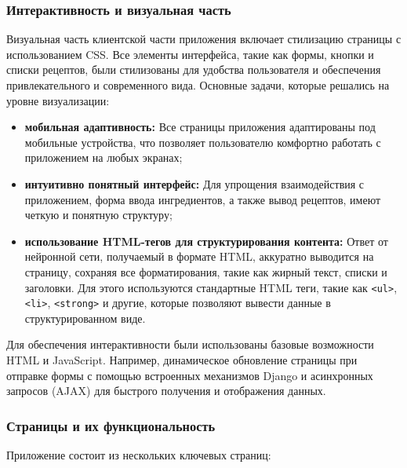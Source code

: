 {{    \subsubsection*{Интерактивность и визуальная часть}
    
    Визуальная часть клиентской части приложения включает стилизацию страницы с использованием CSS. Все элементы интерфейса, такие как формы, кнопки и списки рецептов, были стилизованы для удобства пользователя и обеспечения привлекательного и современного вида. Основные задачи, которые решались на уровне визуализации:
    
    \begin{itemize}
        \item \textbf{мобильная адаптивность:} Все страницы приложения адаптированы под мобильные устройства, что позволяет пользователю комфортно работать с приложением на любых экранах;
        \item \textbf{интуитивно понятный интерфейс:} Для упрощения взаимодействия с приложением, форма ввода ингредиентов, а также вывод рецептов, имеют четкую и понятную структуру;
        \item \textbf{использование HTML-тегов для структурирования контента:} Ответ от нейронной сети, получаемый в формате HTML, аккуратно выводится на страницу, сохраняя все форматирования, такие как жирный текст, списки и заголовки. Для этого используются стандартные HTML теги, такие как \texttt{<ul>}, \texttt{<li>}, \texttt{<strong>} и другие, которые позволяют вывести данные в структурированном виде.
    \end{itemize}
    
    Для обеспечения интерактивности были использованы базовые возможности HTML и JavaScript. Например, динамическое обновление страницы при отправке формы с помощью встроенных механизмов Django и асинхронных запросов (AJAX) для быстрого получения и отображения данных.
    
    \subsubsection*{Страницы и их функциональность}
    
    Приложение состоит из нескольких ключевых страниц:
    
}}
